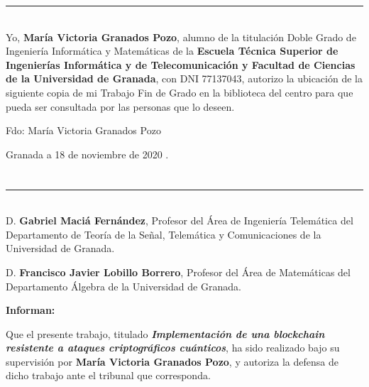 \noindent\rule[-1ex]{\textwidth}{2pt}\\[4.5ex]

Yo, \textbf{María Victoria Granados Pozo}, alumno de la titulación Doble Grado de Ingeniería Informática y Matemáticas de la \textbf{Escuela Técnica Superior
de Ingenierías Informática y de Telecomunicación y Facultad de Ciencias de la Universidad de Granada}, con DNI 77137043, autorizo la
ubicación de la siguiente copia de mi Trabajo Fin de Grado en la biblioteca del centro para que pueda ser
consultada por las personas que lo deseen.

\vspace{6cm}

\noindent Fdo: María Victoria Granados Pozo

\vspace{2cm}

\begin{flushright}
Granada a 18 de noviembre de 2020 .
\end{flushright}


\chapter*{}
\thispagestyle{empty}

\noindent\rule[-1ex]{\textwidth}{2pt}\\[4.5ex]

D. \textbf{Gabriel Maciá Fernández}, Profesor del Área de Ingeniería Telemática del Departamento de Teoría de la Señal, Telemática y Comunicaciones de la Universidad de Granada.

\vspace{0.5cm}

D. \textbf{Francisco Javier Lobillo Borrero}, Profesor del Área de Matemáticas del Departamento Álgebra de la Universidad de Granada.


\vspace{0.5cm}

\textbf{Informan:}

\vspace{0.5cm}

Que el presente trabajo, titulado \textit{\textbf{ Implementación de una blockchain resistente a ataques criptográficos cuánticos}},
ha sido realizado bajo su supervisión por \textbf{María Victoria Granados Pozo}, y autoriza la defensa de dicho trabajo ante el tribunal
que corresponda.

\vspace{0.5cm}

